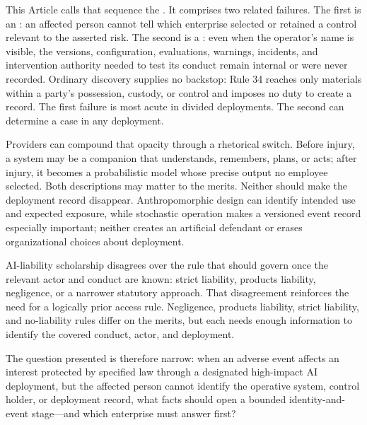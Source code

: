 This Article calls that sequence the . It comprises two related failures. The first is an : an affected person cannot tell which enterprise selected or retained a control relevant to the asserted risk. The second is a : even when the operator's name is visible, the versions, configuration, evaluations, warnings, incidents, and intervention authority needed to test its conduct remain internal or were never recorded. Ordinary discovery supplies no backstop: Rule 34 reaches only materials within a party's possession, custody, or control and imposes no duty to create a record. The first failure is most acute in divided deployments. The second can determine a case in any deployment.

Providers can compound that opacity through a rhetorical switch. Before injury, a system may be a companion that understands, remembers, plans, or acts; after injury, it becomes a probabilistic model whose precise output no employee selected. Both descriptions may matter to the merits. Neither should make the deployment record disappear. Anthropomorphic design can identify intended use and expected exposure, while stochastic operation makes a versioned event record especially important; neither creates an artificial defendant or erases organizational choices about deployment.

AI-liability scholarship disagrees over the rule that should govern once the relevant actor and conduct are known: strict liability, products liability, negligence, or a narrower statutory approach. That disagreement reinforces the need for a logically prior access rule. Negligence, products liability, strict liability, and no-liability rules differ on the merits, but each needs enough information to identify the covered conduct, actor, and deployment.

The question presented is therefore narrow: when an adverse event affects an interest protected by specified law through a designated high-impact AI deployment, but the affected person cannot identify the operative system, control holder, or deployment record, what facts should open a bounded identity-and-event stage---and which enterprise must answer first?

